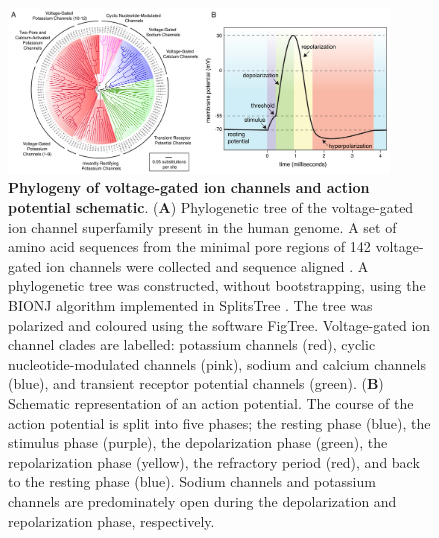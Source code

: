 \begin{refsection}
\begin{figure}[hp]
\centering
\includegraphics[width=0.9\textwidth]{introduction/channelome}
\caption[Phylogeny of voltage-gated ion channels and action potential schematic]{\textbf{Phylogeny of voltage-gated ion channels and action potential schematic}. (\textbf{A}) Phylogenetic tree of the voltage-gated ion channel superfamily present in the human genome. A set of amino acid sequences from the minimal pore regions of 142 voltage-gated ion channels were collected and sequence aligned \cite{Yu:2004ep}. A phylogenetic tree was constructed, without bootstrapping, using the BIONJ algorithm implemented in SplitsTree \cite{Gascuel:1997ua}. The tree was polarized and coloured using the software FigTree. Voltage-gated ion channel clades are labelled: potassium channels (red), cyclic nucleotide-modulated channels (pink),  sodium and calcium channels (blue), and transient receptor potential channels (green). (\textbf{B}) Schematic representation of an action potential. The course of the action potential is split into five phases; the resting phase (blue), the stimulus phase (purple), the depolarization phase (green), the repolarization phase (yellow), the refractory period (red), and back to the resting phase (blue). Sodium channels and potassium channels are predominately open during the depolarization and repolarization phase, respectively.}
\label{fig:channelome_ap}
\end{figure}


\end{refsection}
